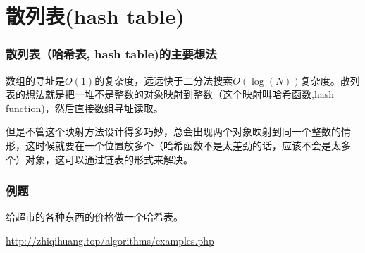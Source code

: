 \documentclass[CJK,14pt]{beamer}
\begin{document}
  \section{散列表(hash table)}
  
  \begin{frame}
    \frametitle{散列表（哈希表, hash table)的主要想法}
      数组的寻址是$O(1)$的复杂度，远远快于二分法搜索$O(\log(N))$复杂度。散列表的想法就是把一堆不是整数的对象映射到整数（这个映射叫哈希函数,hash function)，然后直接数组寻址读取。

        \skipline
        
      但是不管这个映射方法设计得多巧妙，总会出现两个对象映射到同一个整数的情形，这时候就要在一个位置放多个（哈希函数不是太差劲的话，应该不会是太多个）对象，这可以通过链表的形式来解决。
  \end{frame}

  \begin{frame}
    \frametitle{例题}
    给超市的各种东西的价格做一个哈希表。

    \url{http://zhiqihuang.top/algorithms/examples.php}    
  \end{frame}
  
\ech
\end{document}
